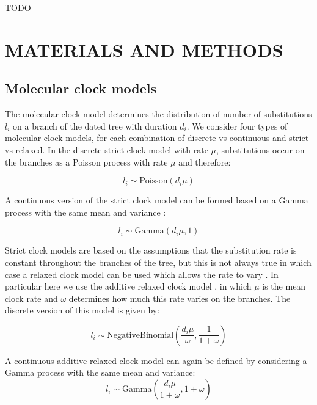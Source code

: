 \documentclass{article}
\begin{document}
TODO

\section*{MATERIALS AND METHODS}

\subsection*{Molecular clock models}

The molecular clock model determines the distribution of number of substitutions $l_i$ on a branch of the dated
tree with duration $d_i$. We consider four types of molecular clock models, for each combination of discrete
vs continuous and strict vs relaxed. In the discrete strict clock
model \citep{Zuckerkandl1962} with rate $\mu$,
substitutions occur on the branches as a Poisson process with rate $\mu$ and therefore:

\begin{equation}
l_i \sim \mathrm{Poisson}(d_i \mu)
\label{eq:sc}
\end{equation}

A continuous version of the strict clock model can be formed based on a Gamma process with the same mean and variance \citep{Didelot2021}:

\begin{equation}
l_i \sim \mathrm{Gamma}(d_i \mu,1)
\label{eq:csc}
\end{equation}

Strict clock models are based on the assumptions that the substitution rate is constant throughout the branches
of the tree, but this is not always true in which case a relaxed clock model can be used which allows
the rate to vary \citep{Drummond2006}. In particular here we use the additive relaxed clock model \citep{Didelot2021},
in which $\mu$ is the mean clock rate and $\omega$ determines how much this rate varies on the branches.
The discrete version of this model is given by: 

\begin{equation}
l_i \sim \mathrm{NegativeBinomial}\left(\frac{d_i \mu}{\omega},\frac{1}{1+\omega}\right)
\label{eq:arc}
\end{equation}

A continuous additive relaxed clock model can again be defined by considering a Gamma process with the same mean and variance:
\begin{equation}
l_i \sim \mathrm{Gamma}\left(\frac{d_i \mu}{1+\omega},1+\omega\right)
\label{eq:carc}
\end{equation}
\end{document}
